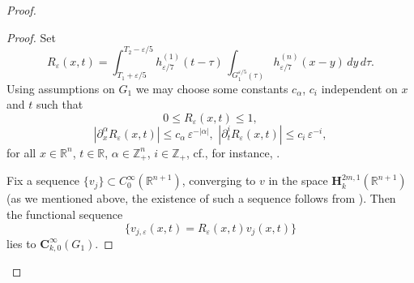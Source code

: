 \documentclass{amsart}
\theoremstyle{definition}
\theoremstyle{remark}
\numberwithin{equation}{section}
\begin{document}
\begin{proof}
\begin{proof}
Set 
$$
R_\varepsilon (x,t) = \int_{T_1+\varepsilon/5}^{T_2-\varepsilon/5} 
 h^{(1)}_{\varepsilon/7} (t-\tau) \, \int_{G_1^{\varepsilon/5} (\tau)}  h^{(n)}_{\varepsilon/7} (x-y) \, dy \, d\tau.
$$
Using assumptions 
on $G_1$ we may choose some constants $c_{\alpha}$, $c_{i} $ independent on  $x$ and $t$ 
such that 
\begin{equation} \label{eq.Bochner.1}
0\leq R_\varepsilon  (x,t)\leq 1,
\end{equation}
\begin{equation} \label{eq.Bochner.2}
|\partial^\alpha_x R_\varepsilon (x,t)| \leq c_{\alpha} \, \varepsilon ^{-|\alpha|}, 
\,\, 
|\partial^i_t  R_\varepsilon (x,t)| \leq c_{i} \, \varepsilon ^{-i}, 
\end{equation}
for all $x \in {\mathbb R}^n$, $t \in \mathbb R$, 
$\alpha \in {\mathbb Z}^n_+$, $i \in {\mathbb Z}_+$, 
cf., for instance, \cite[ch. 3, \S 5]{MikhX}. 

Fix a sequence $\{ v_j\} \subset C^\infty _0({\mathbb R}^{n+1})$, converging to 
$v$ in the space ${\mathbf H}_k^{2m,1} ({\mathbb R}^{n+1} )$ (as we mentioned above, 
the existence of such a sequence follows from \cite[\S 14]{BeINi}). 
Then the functional sequence 
$$
 \{  v_{j,\varepsilon} (x,t)=  R_\varepsilon (x,t)v_j (x,t)\}
$$
lies to ${\mathbf C}^\infty _{k,0} (G_1)$. 


\end{proof}
\end{proof}
\end{document}
